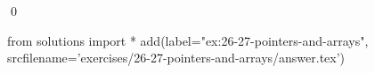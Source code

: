 
\begin{ex}
  \label{ex:26-27-pointers-and-arrays}
  
  \qed
\end{ex}
\begin{python0}
from solutions import *
add(label="ex:26-27-pointers-and-arrays",
    srcfilename='exercises/26-27-pointers-and-arrays/answer.tex')
\end{python0}
